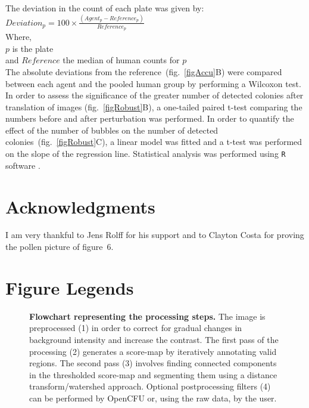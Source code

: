 \documentclass[10pt]{article}
\begin{document}
The deviation in the count of each plate was given by:\\
\newline{}
$Deviation_p =100\times{}\frac{ (Agent_p-Reference_p)}{Reference_p}$\\
\newline{}
Where,\\
$p$ is the plate\\
and $Reference$ the median of human counts for $p$\\

The absolute deviations from the reference~(fig.~\ref{figAccu}B) were compared
between each agent and the pooled human group by performing a Wilcoxon test.
In order to assess the significance of the greater number of detected colonies
after translation of images (fig.~\ref{figRobust}B), a one-tailed paired t-test
comparing the numbers before and after perturbation was performed.
In order to quantify the effect of the number of bubbles on the number of
detected colonies~(fig.~\ref{figRobust}C), a linear model was fitted and a t-test
was performed on the slope of the regression line.
Statistical analysis was performed using \texttt{R} software\cite{R} .
 
\section*{Acknowledgments}
I am very thankful to Jens Rolff for his support and to Clayton
Costa for proving the pollen picture of 
figure~6.


\newpage{}

\section*{Figure Legends} 

\begin{figure}[!ht]
\begin{center}
\end{center}
\caption{{\bf Flowchart representing the processing steps.}
The image is preprocessed (1) in order to correct for gradual
changes in background intensity and increase the contrast.
The first pass of the processing (2) generates a score-map by iteratively annotating valid regions.
The second pass (3) involves finding connected components in the thresholded score-map and segmenting them using a distance transform/watershed approach.
Optional postprocessing filters (4) can be performed by OpenCFU or, using the raw data, by the user. 
}
\label{figFlowChart}
\end{figure}
\end{document}
